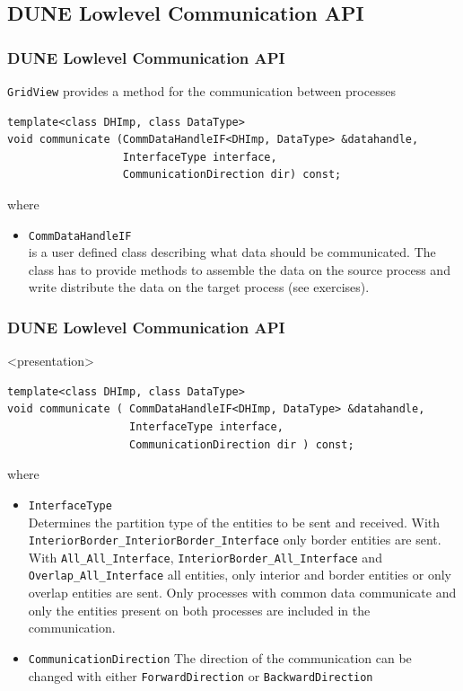 \documentclass[aspectratio=169,11pt]{beamer}
\theoremstyle{definition}
\begin{document}
\subsection{DUNE Lowlevel Communication API}
\begin{frame}[fragile]
  \frametitle<presentation>{DUNE Lowlevel Communication API}

  \texttt{GridView} provides a method for the communication between processes
    \begin{lstlisting}
template<class DHImp, class DataType>
void communicate (CommDataHandleIF<DHImp, DataType> &datahandle,
                  InterfaceType interface,
                  CommunicationDirection dir) const;
    \end{lstlisting}
where
    \begin{itemize}
    \item \lstinline!CommDataHandleIF!\\
      is a user defined class describing what data should be communicated. The class has to provide methods to assemble the data on the
      source process and write distribute the data on the target process (see exercises).
    \end{itemize}
\end{frame}


\begin{frame}[fragile]
  \frametitle<presentation>{DUNE Lowlevel Communication API}
  \begin{onlyenv}<presentation>
    \begin{lstlisting}
template<class DHImp, class DataType>
void communicate ( CommDataHandleIF<DHImp, DataType> &datahandle,
                   InterfaceType interface,
                   CommunicationDirection dir ) const;
    \end{lstlisting}
\lstset{basicstyle=\normalsize\ttfamily}
where
    \end{onlyenv}
    \begin{itemize}
    \item \lstinline!InterfaceType!\\
    Determines the partition type of the entities to be sent and received. With \lstinline!InteriorBorder_InteriorBorder_Interface! only
border entities are sent. With \lstinline!All_All_Interface!,
    \lstinline!InteriorBorder_All_Interface! and
    \lstinline!Overlap_All_Interface! all entities, only interior and border entities or only overlap entities are sent. Only processes with common
data communicate and only the entities present on both processes are included in the communication.
    \item \lstinline!CommunicationDirection!
      The direction of the communication can be changed with either \lstinline!ForwardDirection! or
      \lstinline!BackwardDirection!
    \end{itemize}
\end{frame}
\end{document}
